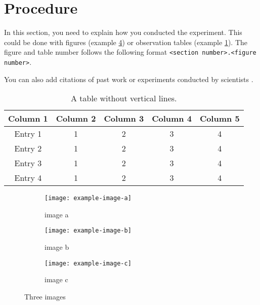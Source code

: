 

\section{Procedure}
In this section, you need to explain how you conducted the experiment. This could be done with figures (example \cref{fig: three images}) or observation tables (example \cref{table: style 1}). The figure and table number follows the following format \texttt{<section number>.<figure number>}.

You can also add citations of past work or experiments conducted by scientists \cite{kottwitz2011}.

\begin{table}[ht]
\centering
\caption{A table without vertical lines.}
\begin{tabular}[t]{ccccc}
\toprule
\color{SIT-red}\textbf{Column 1}&\color{SIT-red}\textbf{Column 2}&\color{SIT-red}\textbf{Column 3}&\color{SIT-red}\textbf{Column 4}&\color{SIT-red}\textbf{Column 5}\\
\midrule
Entry 1&1&2&3&4\\
Entry 2&1&2&3&4\\
Entry 3&1&2&3&4\\
Entry 4&1&2&3&4\\
\bottomrule
\end{tabular}
\label{table: style 1}
\end{table}

\begin{figure}[H]
     \centering
     \begin{subfigure}[b]{0.3\textwidth}
         \centering
         \texttt{[image: example-image-a]}
         \caption{image a}
         \label{fig: style 1 image a}
     \end{subfigure}
     \hfill
     \begin{subfigure}[b]{0.3\textwidth}
         \centering
         \texttt{[image: example-image-b]}
         \caption{image b}
         \label{fig: style 1 image b}
     \end{subfigure}
     \hfill
     \begin{subfigure}[b]{0.3\textwidth}
         \centering
         \texttt{[image: example-image-c]}
         \caption{image c}
         \label{fig: style 1 image c}
     \end{subfigure}
        \caption{Three images}
        \label{fig: three images}
\end{figure}

